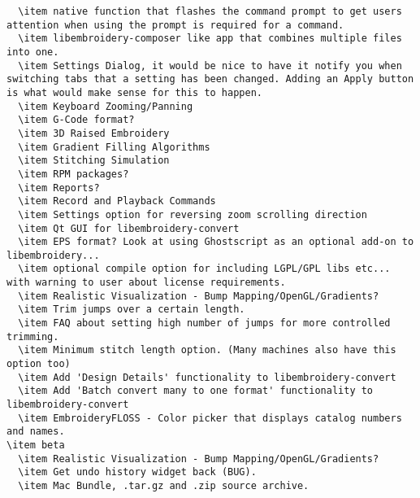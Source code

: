\begin{verbatim}
  \item native function that flashes the command prompt to get users attention when using the prompt is required for a command.
  \item libembroidery-composer like app that combines multiple files into one.
  \item Settings Dialog, it would be nice to have it notify you when switching tabs that a setting has been changed. Adding an Apply button is what would make sense for this to happen.
  \item Keyboard Zooming/Panning
  \item G-Code format?
  \item 3D Raised Embroidery
  \item Gradient Filling Algorithms
  \item Stitching Simulation
  \item RPM packages?
  \item Reports?
  \item Record and Playback Commands
  \item Settings option for reversing zoom scrolling direction
  \item Qt GUI for libembroidery-convert
  \item EPS format? Look at using Ghostscript as an optional add-on to libembroidery...
  \item optional compile option for including LGPL/GPL libs etc... with warning to user about license requirements.
  \item Realistic Visualization - Bump Mapping/OpenGL/Gradients?
  \item Trim jumps over a certain length.
  \item FAQ about setting high number of jumps for more controlled trimming.
  \item Minimum stitch length option. (Many machines also have this option too)
  \item Add 'Design Details' functionality to libembroidery-convert
  \item Add 'Batch convert many to one format' functionality to libembroidery-convert
  \item EmbroideryFLOSS - Color picker that displays catalog numbers and names.
\item beta
  \item Realistic Visualization - Bump Mapping/OpenGL/Gradients?
  \item Get undo history widget back (BUG).
  \item Mac Bundle, .tar.gz and .zip source archive.

\end{verbatim}
